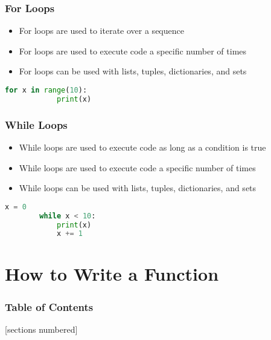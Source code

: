 \documentclass[serif, 9pt, aspectratio=32]{beamer}
\begin{document}
\begin{frame}
    \centering
    \frametitle{For Loops}
    \begin{itemize}
        \setlength{\itemsep}{3em}
        \item For loops are used to iterate over a sequence
        \item For loops are used to execute code a specific number of times
        \item For loops can be used with lists, tuples, dictionaries, and sets
    \end{itemize}
\end{frame}

\begin{frame}[fragile]
    \begin{lstlisting}[language=Python]
        for x in range(10):
            print(x)
    \end{lstlisting}
\end{frame}

\begin{frame}
    \centering
    \frametitle{While Loops}
    \begin{itemize}
        \setlength{\itemsep}{3em}
        \item While loops are used to execute code as long as a condition is true
        \item While loops are used to execute code a specific number of times
        \item While loops can be used with lists, tuples, dictionaries, and sets
    \end{itemize}
\end{frame}

\begin{frame}[fragile]
    \begin{lstlisting}[language=Python]
        x = 0
        while x < 10:
            print(x)
            x += 1
    \end{lstlisting}
\end{frame}

\section{How to Write a Function}

\begin{frame}
    \frametitle{Table of Contents}
    [sections numbered]
    \tableofcontents[currentsection]
\end{frame}
\end{document}
